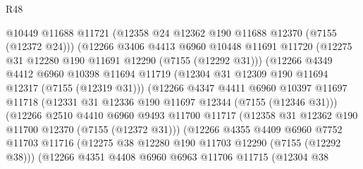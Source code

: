 \begin{lexlean}{R48}
\begin{coremodule}
                              @10449
                              @11688
                              @11721
                              (@12358 @24 @12362 @190 @11688 @12370 (@7155 (@12372 @24)))
                              (@12266
                                @3406
                                @4413
                                @6960
                                @10448
                                @11691
                                @11720
                                (@12275 @31 @12280 @190 @11691 @12290 (@7155 (@12292 @31)))
                                (@12266
                                  @4349
                                  @4412
                                  @6960
                                  @10398
                                  @11694
                                  @11719
                                  (@12304 @31 @12309 @190 @11694 @12317 (@7155 (@12319 @31)))
                                  (@12266
                                    @4347
                                    @4411
                                    @6960
                                    @10397
                                    @11697
                                    @11718
                                    (@12331 @31 @12336 @190 @11697 @12344 (@7155 (@12346 @31)))
                                    (@12266
                                      @2510
                                      @4410
                                      @6960
                                      @9493
                                      @11700
                                      @11717
                                      (@12358 @31 @12362 @190 @11700 @12370 (@7155 (@12372 @31)))
                                      (@12266
                                        @4355
                                        @4409
                                        @6960
                                        @7752
                                        @11703
                                        @11716
                                        (@12275 @38 @12280 @190 @11703 @12290 (@7155 (@12292 @38)))
                                        (@12266
                                          @4351
                                          @4408
                                          @6960
                                          @6963
                                          @11706
                                          @11715
                                          (@12304
                                            @38

\end{coremodule}
\end{lexlean}
